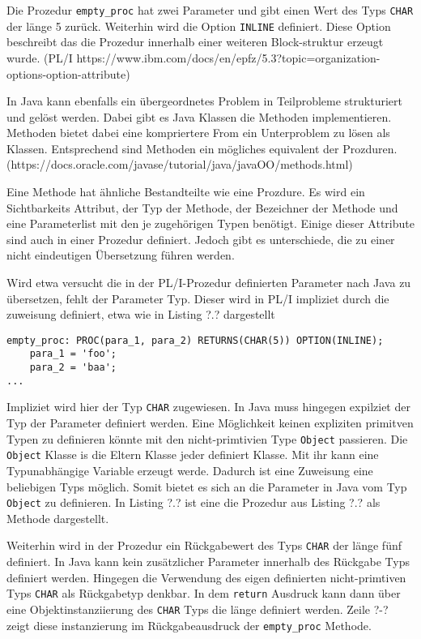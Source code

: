 Die Prozedur \verb+empty_proc+ hat zwei Parameter und gibt einen Wert des Typs \verb+CHAR+ der länge 5 zurück.
Weiterhin wird die Option \verb+INLINE+ definiert. Diese Option beschreibt das die Prozedur innerhalb einer weiteren Block-struktur erzeugt wurde.
(PL/I https://www.ibm.com/docs/en/epfz/5.3?topic=organization-options-option-attribute)

In Java kann ebenfalls ein übergeordnetes Problem in Teilprobleme strukturiert und gelöst werden.
Dabei gibt es Java Klassen die Methoden implementieren. Methoden bietet dabei eine kompriertere From ein Unterproblem zu lösen als Klassen.
Entsprechend sind Methoden ein mögliches equivalent der Prozduren. 
 (https://docs.oracle.com/javase/tutorial/java/javaOO/methods.html)

Eine Methode hat ähnliche Bestandteilte wie eine Prozdure.
Es wird ein Sichtbarkeits Attribut, der Typ der Methode, der Bezeichner der Methode und eine Parameterlist mit den je zugehörigen Typen benötigt.
Einige dieser Attribute sind auch in einer Prozedur definiert.
Jedoch gibt es unterschiede, die zu einer nicht eindeutigen Übersetzung führen werden.

Wird etwa versucht die in der PL/I-Prozedur definierten Parameter nach Java zu übersetzen, fehlt der Parameter Typ.
Dieser wird in PL/I impliziet durch die zuweisung definiert, etwa wie in Listing ?.? dargestellt

\begin{verbatim}
empty_proc: PROC(para_1, para_2) RETURNS(CHAR(5)) OPTION(INLINE);
	para_1 = 'foo';
	para_2 = 'baa';
...
\end{verbatim}

Impliziet wird hier der Typ \verb+CHAR+ zugewiesen.
In Java muss hingegen expilziet der Typ der Parameter definiert werden.
Eine Möglichkeit keinen expliziten primitven Typen zu definieren könnte mit den nicht-primtivien Type \verb+Object+ passieren.
Die \verb+Object+ Klasse is die Eltern Klasse jeder definiert Klasse. Mit ihr kann eine Typunabhängige Variable erzeugt werde.
Dadurch ist eine Zuweisung eine beliebigen Typs möglich. Somit bietet es sich an die Parameter in Java vom Typ \verb+Object+
zu definieren.
In Listing ?.? ist eine die Prozedur aus Listing ?.? als Methode dargestellt.

Weiterhin wird in der Prozedur ein Rückgabewert des Typs \verb+CHAR+ der länge fünf definiert.
In Java kann kein zusätzlicher Parameter innerhalb des Rückgabe Typs definiert werden.
Hingegen die Verwendung des eigen definierten nicht-primtiven Typs \verb+CHAR+ als Rückgabetyp denkbar.
In dem \verb+return+ Ausdruck kann dann über eine Objektinstanziierung des \verb+CHAR+ Typs die länge definiert werden.
Zeile ?-? zeigt diese instanzierung im Rückgabeausdruck der \verb+empty_proc+ Methode.

